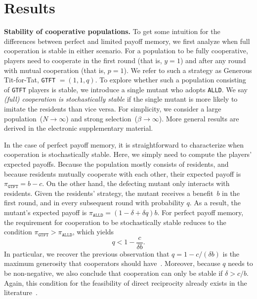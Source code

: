 \documentclass[11pt]{article}
\def\alld{\texttt{ALLD}}
\def\gtft{\texttt{GTFT}}
\def\esm{electronic supplementary material}
\theoremstyle{plainCl1}
\theoremstyle{plainCl2}
\begin{document}

\section{Results}


\noindent
{\bf Stability of cooperative populations.}
To get some intuition for the differences between perfect and limited payoff memory, we first analyze when full cooperation is stable in either scenario.
For a population to be fully cooperative, players need to cooperate in the first round (that is, $y\!=\!1$) and after any round with mutual cooperation (that is, $p\!=\!1$). 
We refer to such a strategy as Generous Tit-for-Tat, \gtft{} $=\!(1,1,q)$. 
To explore whether such a population consisting of \gtft{} players is stable, we introduce a single mutant who adopts \alld. 
We say {\it (full) cooperation is stochastically stable} if the single mutant is more likely to imitate the residents than vice versa. 
For simplicity, we consider a large population~($N\!\rightarrow\!\infty$) and strong selection~($\beta\!\rightarrow\!\infty$).
More general results are derived in the \esm. 


In the case of perfect payoff memory, it is straightforward to characterize when cooperation is stochastically stable. 
Here, we simply need to compute the players' expected payoffs. 
Because the population mostly consists of residents, and because residents mutually cooperate with each other, their expected payoff is $\pi_\gtft = b\!-\!c$. 
On the other hand, the defecting mutant only interacts with residents. 
Given the residents' strategy, the mutant receives a benefit~$b$ in the first round, and in every subsequent round with probability $q$. 
As a result, the mutant's expected payoff is $\pi_\alld \!=\! (1\!-\!\delta\!+\!\delta q)b$. 
For perfect payoff memory, the requirement for cooperation to be stochastically stable reduces to the condition $\pi_\gtft > \pi_\alld$, which yields
\begin{equation} \label{Eq:PerfectMemory}
q < 1\!-\!\frac{c}{\delta  b}.
\end{equation}
In particular, we recover the previous observation that $q\!=\!1-c/(\delta b)$ is the maximum generosity that cooperators should have~\citep{molander:jcr:1985,Nowak1992tit,Schmid:NHB:2021}. 
Moreover, because $q$ needs to be non-negative, we also conclude that cooperation can only be stable if $\delta \!>\! c/b$.
Again, this condition for the feasibility of direct reciprocity already exists in the literature~\citep{nowak:Science:2006}.
\end{document}
